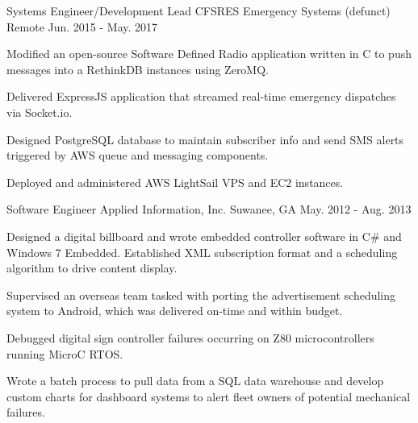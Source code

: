 \begin{cventries}
  \cventry
    {Systems Engineer/Development Lead} %
    {CFSRES Emergency Systems (defunct)} %
    {Remote} %
    {Jun. 2015 - May. 2017} %
    {
      \begin{cvitems} %
        \item {Modified an open-source Software Defined Radio application written in C to push messages into a RethinkDB instances using ZeroMQ.}
        \item {Delivered ExpressJS application that streamed real-time emergency dispatches via Socket.io.}
        \item {Designed PostgreSQL database to maintain subscriber info and send SMS alerts triggered by AWS queue and messaging components.}
        \item {Deployed and administered AWS LightSail VPS and EC2 instances.}
      \end{cvitems}
    }

  \cventry
    {Software Engineer} %
    {Applied Information, Inc.} %
    {Suwanee, GA} %
    {May. 2012 - Aug. 2013} %
    {
      \begin{cvitems} %
        \item {Designed a digital billboard and wrote embedded controller software in C\# and Windows 7 Embedded. Established XML subscription format and a scheduling algorithm to drive content display.}
        \item {Supervised an overseas team tasked with porting the advertisement scheduling system to Android, which was delivered on-time and within budget.}
        \item {Debugged digital sign controller failures occurring on Z80 microcontrollers running MicroC RTOS.}
        \item {Wrote a batch process to pull data from a SQL data warehouse and develop custom charts for dashboard systems to alert fleet owners of potential mechanical failures.}
      \end{cvitems}
    }

\end{cventries}
